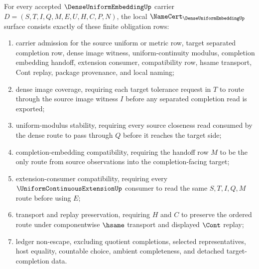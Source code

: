 \begin{theorem}
\label{thm:dense-uniform-embedding-namecert-obligations}
For every accepted $\DenseUniformEmbeddingUp$ carrier $D=(S,T,I,Q,M,E,U,H,C,P,N)$, the local $\NameCert_{\DenseUniformEmbeddingUp}$ surface consists exactly of these finite obligation rows:
\begin{enumerate}
\item carrier admission for the source uniform or metric row, target separated completion row, dense image witness, uniform-continuity modulus, completion embedding handoff, extension consumer, compatibility row, hsame transport, Cont replay, package provenance, and local naming;
\item dense image coverage, requiring each target tolerance request in $T$ to route through the source image witness $I$ before any separated completion read is exported;
\item uniform-modulus stability, requiring every source closeness read consumed by the dense route to pass through $Q$ before it reaches the target side;
\item completion-embedding compatibility, requiring the handoff row $M$ to be the only route from source observations into the completion-facing target;
\item extension-consumer compatibility, requiring every $\UniformContinuousExtensionUp$ consumer to read the same $S,T,I,Q,M$ route before using $E$;
\item transport and replay preservation, requiring $H$ and $C$ to preserve the ordered route under componentwise $\hsame$ transport and displayed $\Cont$ replay;
\item ledger non-escape, excluding quotient completions, selected representatives, host equality, countable choice, ambient completeness, and detached target-completion data.
\end{enumerate}
\end{theorem}
